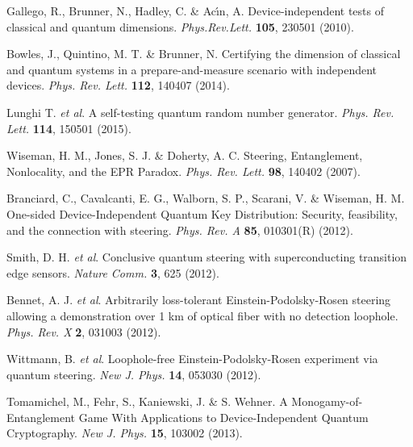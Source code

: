 \documentclass[11pt,a4paper]{article}
\begin{document}
{\begin{thebibliography}{99}
Gallego, R., Brunner, N., Hadley, C. \& Ac\'\i n, A. Device-independent tests of classical and quantum dimensions. \textit{Phys.Rev.Lett.} \textbf{105}, 230501 (2010).

Bowles, J., Quintino, M. T. \& Brunner, N. Certifying the dimension of classical and quantum systems in a prepare-and-measure scenario with independent devices. \textit{Phys. Rev. Lett.} \textbf{112}, 140407 (2014).

Lunghi T.  {\em et al}.
A self-testing quantum random number generator. \textit{Phys. Rev. Lett.} \textbf{114}, 150501 (2015).

Wiseman, H. M., Jones, S. J.  \& Doherty, A. C. Steering, Entanglement, Nonlocality, and the EPR Paradox. \textit{Phys. Rev. Lett.}  \textbf{98}, 140402 (2007).

Branciard, C., Cavalcanti, E. G., Walborn, S. P., Scarani,  V. \& Wiseman, H. M. One-sided Device-Independent Quantum Key Distribution: Security, feasibility, and the connection with steering. \textit{Phys. Rev. A} \textbf{85}, 010301(R) (2012).

Smith, D. H.  {\em et al}.
Conclusive quantum steering with superconducting transition edge sensors. \textit{Nature Comm.} \textbf{3}, 625 (2012).

Bennet, A. J.  {\em et al}.
Arbitrarily loss-tolerant Einstein-Podolsky-Rosen steering allowing a demonstration over 1 km of optical fiber with no detection loophole. \textit{Phys. Rev. X} \textbf{2}, 031003 (2012).

Wittmann, B. {\it et al}.
Loophole-free Einstein-Podolsky-Rosen experiment via quantum steering. \textit{New J. Phys.} \textbf{14}, 053030 (2012).

Tomamichel, M., Fehr, S., Kaniewski, J. \& S. Wehner. A Monogamy-of-Entanglement Game With Applications to Device-Independent Quantum Cryptography. \textit{New J. Phys.} \textbf{15}, 103002 (2013).


\end{thebibliography}}
\end{document}
